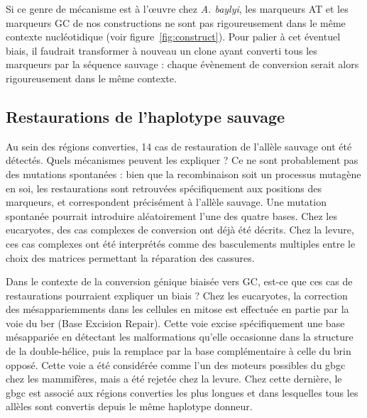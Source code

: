 Si ce genre de mécanisme est à l'œuvre chez \emph{A. baylyi}, les marqueurs AT
et les marqueurs GC de nos constructions ne sont pas rigoureusement dans le même
contexte nucléotidique (voir figure~\ref{fig:construct}). Pour palier à cet
éventuel biais, il faudrait transformer à nouveau un clone ayant converti tous
les marqueurs par la séquence sauvage : chaque évènement de conversion serait
alors rigoureusement dans le même contexte.

\subsection{Restaurations de l'haplotype sauvage}
\label{subsub:discu-restaur}
\afterpage{\blankpage}

Au sein des régions converties, 14 cas de restauration de l'allèle sauvage ont
été détectés. Quels mécanismes peuvent les expliquer ? Ce ne sont probablement
pas des mutations spontanées : bien que la recombinaison soit un processus
mutagène en soi\cite{rodgers_error-prone_2016,hicks_increased_2010}, les
restaurations sont retrouvées spécifiquement aux positions des marqueurs, et
correspondent précisément à l'allèle sauvage. Une mutation spontanée pourrait
introduire aléatoirement l'une des quatre bases. Chez les eucaryotes, des cas
complexes de conversion ont déjà été
décrits\cite{martini_genome-wide_2011,yeadon_recombination_2001}. Chez la
levure, ces cas complexes ont été interprétés comme des basculements multiples
entre le choix des matrices permettant la réparation des
cassures\cite{hoffmann_trans_2005}.

Dans le contexte de la conversion génique biaisée vers GC, est-ce que ces cas de
restaurations pourraient expliquer un biais ? Chez les eucaryotes, la correction
des mésappariemments dans les cellules en mitose est effectuée en partie par la
voie du \ac{ber} (Base Excision Repair). Cette voie excise spécifiquement une
base mésappariée en détectant les malformations qu'elle occasionne dans la
structure de la double-hélice, puis la remplace par la base complémentaire à
celle du brin opposé\cite{krokan_base_2013}. Cette voie a été considérée comme
l'un des moteurs possibles du \ac{gbgc} chez les
mammifères\cite{duret_biased_2009}, mais a été rejetée chez la
levure\cite{lesecque_gc-biased_2013}. Chez cette dernière, le \ac{gbgc} est
associé aux régions converties les plus longues et dans lesquelles tous les
allèles sont convertis depuis le même haplotype donneur.

